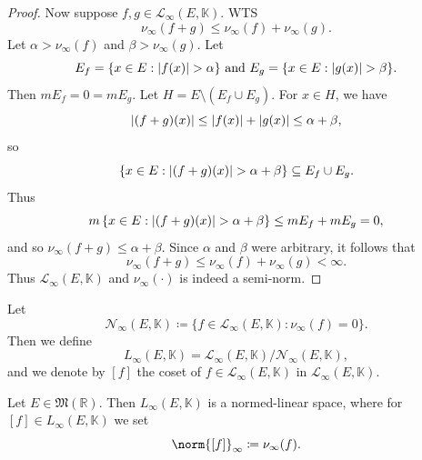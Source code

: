 \documentclass[notoc,notitlepage]{tufte-book}
\begin{document}
\begin{proof}
  Now suppose $f, g \in \mathcal{L}_\infty(E, \mathbb{K})$.
  WTS
  \begin{equation*}
    \nu_\infty(f + g) \leq \nu_\infty(f) + \nu_\infty(g).
  \end{equation*}
  Let $\alpha > \nu_\infty(f)$ and $\beta > \nu_\infty(g)$. Let
  \begin{equation*}
    E_f = \{ x \in E : \left|f(x)\right| > \alpha \} \text{ and }
    E_g = \{ x \in E : \left|g(x)\right| > \beta \}.
  \end{equation*}
  Then $mE_f = 0 = mE_g$.
  Let $H = E \setminus (E_f \cup E_g)$.
  For $x \in H$, we have
  \begin{equation*}
    \left|(f + g)(x)\right| \leq \left|f(x)\right| + \left|g(x)\right| \leq \alpha + \beta,
  \end{equation*}
  so
  \begin{equation*}
    \{ x \in E : \left|(f + g)(x)\right| > \alpha + \beta \} \subseteq E_f \cup E_g.
  \end{equation*}
  Thus
  \begin{equation*}
    m \left\{ x \in E : \left|(f + g)(x)\right| > \alpha + \beta \right\} \leq mE_f +
    mE_g = 0,
  \end{equation*}
  and so $\nu_\infty(f + g) \leq \alpha + \beta$.
  Since $\alpha$ and $\beta$ were arbitrary,
  it follows that
  \begin{equation*}
    \nu_\infty(f + g) \leq \nu_\infty(f) + \nu_\infty(g) < \infty.
  \end{equation*}
  Thus $\mathcal{L}_\infty(E, \mathbb{K})$ and $\nu_\infty(\cdot)$ is indeed a
  semi-norm.
\end{proof}

\begin{defn}\label{defn:_l_infty_e_k_}
  Let
  \begin{equation*}
    \mathcal{N}_\infty(E, \mathbb{K}) \coloneqq \{ f \in \mathcal{L}_\infty(E,
    \mathbb{K}) : \nu_\infty(f) = 0 \}.
  \end{equation*}
  Then we define
  \begin{equation*}
    L_\infty(E, \mathbb{K}) = \mathcal{L}_\infty(E, \mathbb{K}) /
    \mathcal{N}_\infty(E, \mathbb{K}),
  \end{equation*}
  and we denote by $[f]$ the coset of $f \in \mathcal{L}_\infty(E, \mathbb{K})$ 
  in $\mathcal{L}_\infty(E, \mathbb{K})$.
\end{defn}

\begin{thm}\label{thm:_l_infty_e_k_is_a_normed_linear_space}
  Let $E \in \mathfrak{M}(\mathbb{R})$.
  Then $L_\infty(E, \mathbb{K})$ is a normed-linear space,
  where for $[f] \in L_\infty(E, \mathbb{K})$ we set
  \begin{equation*}
    \norm{[f]}_\infty \coloneqq \nu_\infty(f).
  \end{equation*}
\end{thm}
\end{document}
